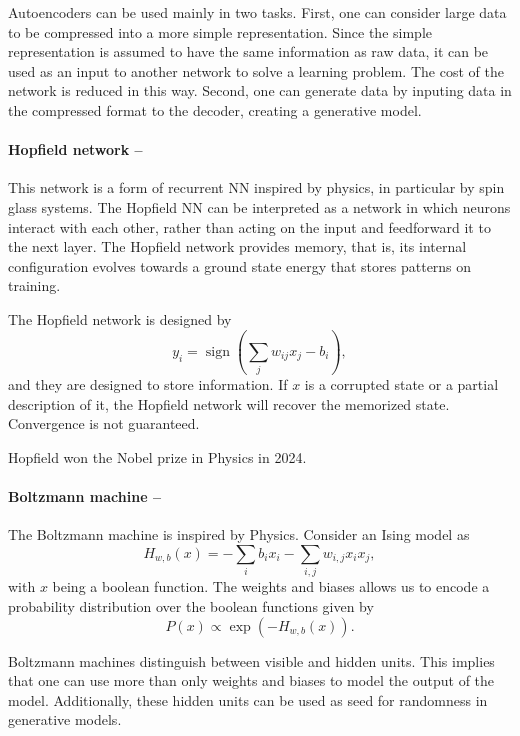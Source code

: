 \documentclass[]{report}
\begin{document}
Autoencoders can be used mainly in two tasks. First, one can consider large data to be compressed into a more simple representation. Since the simple representation is assumed to have the same information as raw data, it can be used as an input to another network to solve a learning problem. The cost of the network is reduced in this way. Second, one can generate data by inputing data in the compressed format to the decoder, creating a generative model. 

\paragraph{Hopfield network --} This network is a form of recurrent NN inspired by physics, in particular by spin glass systems. The Hopfield NN can be interpreted as a network in which neurons interact with each other, rather than acting on the input and feedforward it to the next layer. The Hopfield network provides memory, that is, its internal configuration evolves towards a ground state energy that stores patterns on training. 

The Hopfield network is designed by
\begin{equation}
y_i = \operatorname{sign}\left(\sum_j w_{ij} x_j - b_i\right), 
\end{equation}
and they are designed to store information. If $x$ is a corrupted state or a partial description of it, the Hopfield network will recover the memorized state. Convergence is not guaranteed. 

Hopfield won the Nobel prize in Physics in 2024.

\paragraph{Boltzmann machine --} The Boltzmann machine is inspired by Physics. Consider an Ising model as
\begin{equation}
H_{w, b}(x) = - \sum_i b_i x_i - \sum_{i, j} w_{i, j} x_i x_j, 
\end{equation}
with $x$ being a boolean function. The weights and biases allows us to encode a probability distribution over the boolean functions given by 
\begin{equation}
P(x) \propto \exp(- H_{w, b}(x)). 
\end{equation}

Boltzmann machines distinguish between visible and hidden units. This implies that one can use more than only weights and biases to model the output of the model. Additionally, these hidden units can be used as seed for randomness in generative models. 
\end{document}
